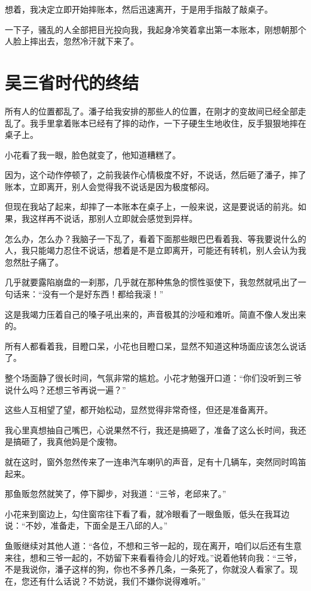 想着，我决定立即开始摔账本，然后迅速离开，于是用手指敲了敲桌子。

一下子，骚乱的人全部把目光投向我，我起身冷笑着拿出第一本账本，刚想朝那个人脸上摔出去，忽然冷汗就下来了。

\chapter{吴三省时代的终结}

所有人的位置都乱了。潘子给我安排的那些人的位置，在刚才的变故间已经全部走乱了。我手里拿着账本已经有了摔的动作，一下子硬生生地收住，反手狠狠地摔在桌子上。

小花看了我一眼，脸色就变了，他知道糟糕了。

因为，这个动作停顿了，之前我装作心情极度不好，不说话，然后砸了潘子，摔了账本，立即离开，别人会觉得我不说话是因为极度郁闷。

但现在我站了起来，却摔了一本账本在桌子上，一般来说，这是要说话的前兆。如果，我这样再不说话，那别人立即就会感觉到异样。

怎么办，怎么办？我脑子一下乱了，看着下面那些眼巴巴看着我、等我要说什么的人，我只能竭力忍住不说话，想着是不是立即离开，可能还有转机，别人会认为我忽然肚子痛了。

几乎就要露陷崩盘的一刹那，几乎就在那种焦急的惯性驱使下，我忽然就吼出了一句话来：“没有一个是好东西！都给我滚！”

这是我竭力压着自己的嗓子吼出来的，声音极其的沙哑和难听。简直不像人发出来的。

所有人都看着我，目瞪口呆，小花也目瞪口呆，显然不知道这种场面应该怎么说话了。

整个场面静了很长时间，气氛非常的尴尬。小花才勉强开口道：“你们没听到三爷说什么吗？还想三爷再说一遍？”

这些人互相望了望，都开始松动，显然觉得非常奇怪，但还是准备离开。

我心里真想抽自己嘴巴，心说果然不行，我还是搞砸了，准备了这么长时间，我还是搞砸了，我真他妈是个废物。

就在这时，窗外忽然传来了一连串汽车喇叭的声音，足有十几辆车，突然同时鸣笛起来。

那鱼贩忽然就笑了，停下脚步，对我道：“三爷，老邱来了。”

小花来到窗边上，勾住窗帘往下看了看，就冷眼看了一眼鱼贩，低头在我耳边说：“不妙，准备走，下面全是王八邱的人。”

鱼贩继续对其他人道：“各位，不想和三爷一起的，现在离开，咱们以后还有生意来往，想和三爷一起的，不妨留下来看看待会儿的好戏。”说着他转向我：“三爷，不是我说你，潘子这样的狗，你也不多养几条，一条死了，你就没人看家了。现在，您还有什么话说？不妨说，我们不嫌你说得难听。”

